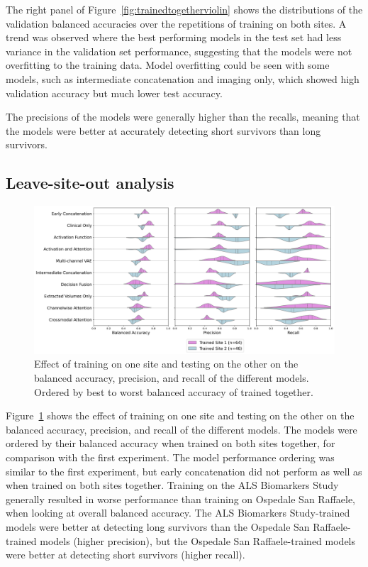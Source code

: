 The right panel of Figure~\ref{fig:trainedtogetherviolin} shows the distributions of the validation balanced accuracies over the repetitions of training on both sites.
A trend was observed where the best performing models in the test set had less variance in the validation set performance, suggesting that the models were not overfitting to the training data.
Model overfitting could be seen with some models, such as intermediate concatenation and imaging only, which showed high validation accuracy but much lower test accuracy.

The precisions of the models were generally higher than the recalls, meaning that the models were better at accurately detecting short survivors than long survivors.

\subsection{Leave-site-out analysis}

\begin{figure}
    \centering
    \hspace*{-2cm}
    \includegraphics[width=1.2\textwidth]{figures/violinplot_site_effect}
    \caption{Effect of training on one site and testing on the other on the balanced accuracy, precision, and recall of the different models. Ordered by best to worst balanced accuracy of trained together.}
    \label{fig:site_effect}
\end{figure}

Figure~\ref{fig:site_effect} shows the effect of training on one site and testing on the other on the balanced accuracy, precision, and recall of the different models.
The models were ordered by their balanced accuracy when trained on both sites together, for comparison with the first experiment.
The model performance ordering was similar to the first experiment, but early concatenation did not perform as well as when trained on both sites together.
Training on the ALS Biomarkers Study generally resulted in worse performance than training on Ospedale San Raffaele, when looking at overall balanced accuracy.
The ALS Biomarkers Study-trained models were better at detecting long survivors than the Ospedale San Raffaele-trained models (higher precision), but the Ospedale San Raffaele-trained models were better at detecting short survivors (higher recall).

